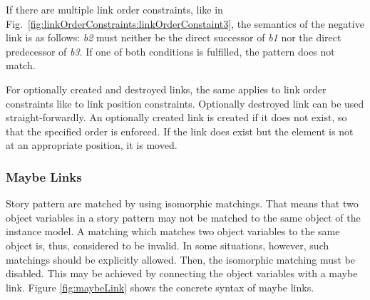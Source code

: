 {If there are multiple link order constraints, like in Fig.~\ref{fig:linkOrderConstraints:linkOrderConstaint3}, the semantics of the negative link is as follows: \emph{b2} must neither be the direct successor of \emph{b1} nor the direct predecessor of \emph{b3}. If one of both conditions is fulfilled, the pattern does not match.


For optionally created and destroyed links, the same applies to link order constraints like to link position constraints. Optionally destroyed link can be used straight-forwardly. An optionally created link is created if it does not exist, so that the specified order is enforced. If the link does exist but the element is not at an appropriate position, it is moved.

\subsubsection{Maybe Links}
\label{sec:StoryPatterns:specialLinks:maybeLink}

Story pattern are matched by using isomorphic matchings. That means that two object variables in a story pattern may not be matched to the same object of the instance model. A matching which matches two object variables to the same object is, thus, considered to be invalid. In some situations, however, such matchings should be explicitly allowed. Then, the isomorphic matching must be disabled. This may be achieved by connecting the object variables with a maybe link. Figure \ref{fig:maybeLink} shows the concrete syntax of maybe links. 

}
